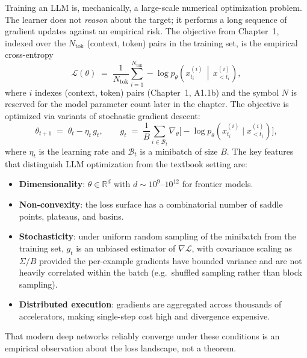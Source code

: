 Training an LLM is, mechanically, a large-scale numerical optimization
problem. The learner does not \emph{reason} about the target; it performs a
long sequence of gradient updates against an empirical risk. The objective
from Chapter~1, indexed over the $N_{\mathrm{tok}}$ (context, token) pairs in
the training set, is the empirical cross-entropy
\begin{equation}
\label{eq:week2-empirical-loss}
\mathcal{L}(\theta)
  \;=\; \frac{1}{N_{\mathrm{tok}}} \sum_{i=1}^{N_{\mathrm{tok}}}
        -\log p_{\theta}\!\left( x^{(i)}_{t_i} \,\middle|\, x^{(i)}_{<t_i} \right),
\end{equation}
where $i$ indexes (context, token) pairs (Chapter~1, A1.1b) and the
symbol $N$ is reserved for the model parameter count later in the
chapter. The objective is optimized via variants of stochastic
gradient descent:
\begin{equation}
\label{eq:week2-sgd}
\theta_{t+1} \;=\; \theta_t - \eta_t\, g_t,
\qquad
g_t \;=\; \frac{1}{B}\sum_{i \in \mathcal{B}_t}
          \nabla_\theta \bigl[-\log p_{\theta}(x^{(i)}_{t_i} \mid x^{(i)}_{<t_i})\bigr],
\end{equation}
where $\eta_t$ is the learning rate and $\mathcal{B}_t$ is a minibatch of
size $B$. The key features that distinguish LLM optimization from the
textbook setting are:
\begin{itemize}
  \item \textbf{Dimensionality}: $\theta \in \mathbb{R}^d$ with
        $d \sim 10^{9}$--$10^{12}$ for frontier models.
  \item \textbf{Non-convexity}: the loss surface has a combinatorial
        number of saddle points, plateaus, and basins.
  \item \textbf{Stochasticity}: under uniform random sampling of the
        minibatch from the training set, $g_t$ is an unbiased estimator
        of $\nabla \mathcal{L}$, with covariance scaling as $\Sigma/B$
        provided the per-example gradients have bounded variance and
        are not heavily correlated within the batch (e.g.\ shuffled
        sampling rather than block sampling).
  \item \textbf{Distributed execution}: gradients are aggregated across
        thousands of accelerators, making single-step cost high and
        divergence expensive.
\end{itemize}
That modern deep networks reliably converge under these conditions is an
empirical observation about the loss landscape, not a theorem.

